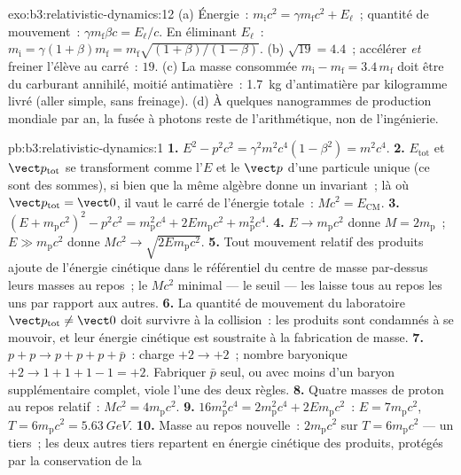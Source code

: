 \begin{solution}{exo:b3:relativistic-dynamics:12}
(a) Énergie~: $m_{\text{i}}c^2 = \gamma m_{\text{f}}c^2 + E_\ell$~;
quantité de mouvement~: $\gamma m_{\text{f}}\beta c = E_\ell/c$. En
éliminant $E_\ell$~: $m_{\text{i}} = \gamma(1 + \beta)m_{\text{f}} =
m_{\text{f}}\sqrt{(1+\beta)/(1-\beta)}$. (b) $\sqrt{19} = 4.4$~;
accélérer \emph{et} freiner l'élève au carré~: $19$. (c) La masse
consommée $m_{\text{i}} - m_{\text{f}} = 3.4\,m_{\text{f}}$ doit être
du carburant annihilé, moitié antimatière~: \qty{1.7}{kg}
d'antimatière par kilogramme livré (aller simple, sans freinage). (d)
À quelques nanogrammes de production mondiale par an, la fusée à
photons reste de l'arithmétique, non de l'ingénierie.
\end{solution}

\begin{solution}{pb:b3:relativistic-dynamics:1}
\textbf{1.} $E^2 - p^2c^2 = \gamma^2m^2c^4(1 - \beta^2) = m^2c^4$.
\textbf{2.} $E_{\text{tot}}$ et $\vect p_{\text{tot}}$ se transforment
comme l'$E$ et le $\vect p$ d'une particule unique (ce sont des
sommes), si bien que la même algèbre donne un invariant~; là où
$\vect p_{\text{tot}} = \vect 0$, il vaut le carré de l'énergie
totale~: $Mc^2 = E_{\text{CM}}$.
\textbf{3.} $(E + m_{\text{p}}c^2)^2 - p^2c^2 = m_{\text{p}}^2c^4 +
2Em_{\text{p}}c^2 + m_{\text{p}}^2c^4$.
\textbf{4.} $E \to m_{\text{p}}c^2$ donne $M = 2m_{\text{p}}$~;
$E \gg m_{\text{p}}c^2$ donne $Mc^2 \to \sqrt{2Em_{\text{p}}c^2}$.
\textbf{5.} Tout mouvement relatif des produits ajoute de l'énergie
cinétique dans le référentiel du centre de masse par-dessus leurs
masses au repos~; le $Mc^2$ minimal --- le seuil --- les laisse tous au
repos les uns par rapport aux autres.
\textbf{6.} La quantité de mouvement du laboratoire
$\vect p_{\text{tot}} \neq \vect 0$ doit survivre à la collision~: les
produits sont condamnés à se mouvoir, et leur énergie cinétique est
soustraite à la fabrication de masse.
\textbf{7.} $p + p \to p + p + p + \bar p$~: charge $+2 \to +2$~;
nombre baryonique $+2 \to 1 + 1 + 1 - 1 = +2$. Fabriquer $\bar p$ seul,
ou avec moins d'un baryon supplémentaire complet, viole l'une des deux
règles.
\textbf{8.} Quatre masses de proton au repos relatif~: $Mc^2 =
4m_{\text{p}}c^2$.
\textbf{9.} $16m_{\text{p}}^2c^4 = 2m_{\text{p}}^2c^4 +
2Em_{\text{p}}c^2$~: $E = 7m_{\text{p}}c^2$, $T = 6m_{\text{p}}c^2 =
\qty{5.63}{GeV}$.
\textbf{10.} Masse au repos nouvelle~: $2m_{\text{p}}c^2$ sur $T =
6m_{\text{p}}c^2$ --- un tiers~; les deux autres tiers repartent en
énergie cinétique des produits, protégés par la conservation de la

\end{solution}
